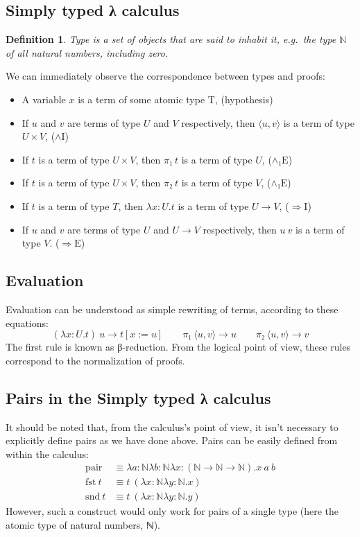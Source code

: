 \documentclass[12pt]{article}
\newtheorem{definition}{Definition}
\begin{document}
\subsection{Simply typed λ calculus}
\label{simply}
\begin{definition}
    Type is a set of objects that are said to inhabit it, e.g.\ the type $ℕ$ of all natural numbers, including zero.
\end{definition}
We can immediately observe the correspondence between types and proofs:
\begin{itemize}
    \item A variable $x$ is a term of some atomic type T, \hfill (hypothesis)
    \item If $u$ and $v$ are terms of type $U$ and $V$ respectively, then $⟨u,v⟩$ is a term of type $U × V$, \hfill ($\mathrm{∧I}$)
    \item If $t$ is a term of type $U × V$, then $π₁ \ t$ is a term of type $U$, \hfill ($\mathrm{∧₁E}$)
    \item If $t$ is a term of type $U × V$, then $π₂ \ t$ is a term of type $V$, \hfill ($\mathrm{∧₁E}$)
    \item If $t$ is a term of type $T$, then $λx:U.t$ is a term of type $U → V$, \hfill ($\mathrm{⇒I}$)
    \item If $u$ and $v$ are terms of type $U$ and $U → V$ respectively, then $u \ v$ is a term of type $V$. \hfill ($\mathrm{⇒E}$)
\end{itemize}

\subsection{Evaluation}
Evaluation can be understood as simple rewriting of terms, according to these equations:
\[(λx:U.t) \ u → t[x:=u] \qquad π₁ \ ⟨u,v⟩ → u \qquad π₂ \ ⟨u,v⟩ → v\]
The first rule is known as β-reduction. From the logical point of view, these rules correspond to the normalization of proofs.

\subsection{Pairs in the Simply typed λ calculus}
\label{crappairs}
It should be noted that, from the calculus's point of view, it isn't necessary to explicitly define pairs as we have done above. Pairs can be easily defined from within the calculus:
\begin{align*}
    \mathrm{pair} &≡ λa:ℕλb:ℕλx:(ℕ → ℕ → ℕ).x \ a \ b\\
    \mathrm{fst} \ t &≡ t \ (λx:ℕλy:ℕ.x)\\
    \mathrm{snd} \ t &≡ t \ (λx:ℕλy:ℕ.y)
\end{align*}
However, such a construct would only work for pairs of a single type (here the atomic type of natural numbers, ℕ).
\end{document}
